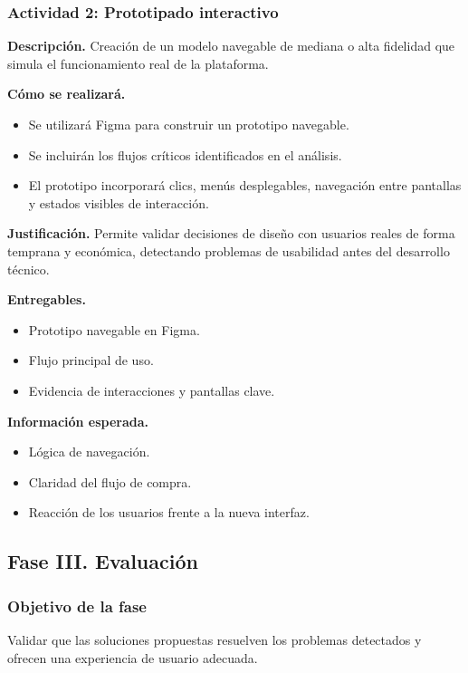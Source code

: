 \documentclass[12pt,letterpaper]{article}
\begin{document}
\subsubsection{Actividad 2: Prototipado interactivo}

\textbf{Descripción.} Creación de un modelo navegable de mediana o alta fidelidad que simula el funcionamiento real de la plataforma.

\textbf{Cómo se realizará.}
\begin{itemize}
    \item Se utilizará Figma para construir un prototipo navegable.
    \item Se incluirán los flujos críticos identificados en el análisis.
    \item El prototipo incorporará clics, menús desplegables, navegación entre pantallas y estados visibles de interacción.
\end{itemize}

\textbf{Justificación.} Permite validar decisiones de diseño con usuarios reales de forma temprana y económica, detectando problemas de usabilidad antes del desarrollo técnico.

\textbf{Entregables.}
\begin{itemize}
    \item Prototipo navegable en Figma.
    \item Flujo principal de uso.
    \item Evidencia de interacciones y pantallas clave.
\end{itemize}

\textbf{Información esperada.}
\begin{itemize}
    \item Lógica de navegación.
    \item Claridad del flujo de compra.
    \item Reacción de los usuarios frente a la nueva interfaz.
\end{itemize}

\subsection{Fase III. Evaluación}

\subsubsection{Objetivo de la fase}
Validar que las soluciones propuestas resuelven los problemas detectados y ofrecen una experiencia de usuario adecuada.
\end{document}
